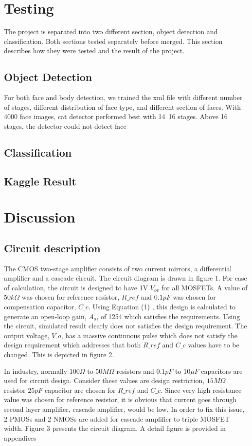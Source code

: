 \documentclass[conference,compsoc]{IEEEtran}
\begin{document}
\section{Testing}
The project is separated into two different section, object detection and classification. Both sections tested separately before merged. This section describes how they were tested and the result of the project.
\subsection{Object Detection}
For both face and body detection, we trained the xml file with different number of stages, different distribution of face type, and different section of faces. With 4000 face images, cat detector performed best with 14~16 stages. Above 16 stages, the detector could not detect face
\subsection{Classification}
\subsection{Kaggle Result}
\section{Discussion}


\subsection{Circuit description}
The CMOS two-stage amplifier consists of two current
mirrors, a differential amplifier and a cascade circuit. The circuit diagram is drawn in figure 1. For ease of calculation, the circuit is designed to have 1V \(V_{ov}\) for all MOSFETs.  A value of \(50 k\Omega\) was chosen for reference resistor, \(R\_ref\) and \(0.1 pF\) was chosen for compensation capacitor, \(C\_c\). Using Equation (1) , this design is calculated to generate an open-loop gain, \(A_o\), of 1254 which satisfies the requirements. Using the circuit, simulated result clearly does not satisfies the design requirement. The output voltage, \(V\_o\), has a massive continuous pulse which does not satisfy the design requirement which addresses that both \(R\_ref\) and \(C\_c\) values have to be changed. This is depicted in figure 2.

In industry, normally \(100\Omega\) to \(50M\Omega\) resistors and \(0.1pF\) to \(10\mu F\) capacitors are used for circuit design. Consider these values are design restriction, \(15M\Omega\) resistor \(25pF\) capacitor are chosen for \(R\_ref\) and \(C\_c\). Since very high resistance value was chosen for reference resistor, it is obvious that current goes through second layer amplifier, cascade amplifier, would be low. In order to fix this issue, 2 PMOSs and 2 NMOSs are added for cascade amplifier to triple MOSFET width. Figure 3 presents the circuit diagram. A detail figure is provided in appendices\\
\end{document}
